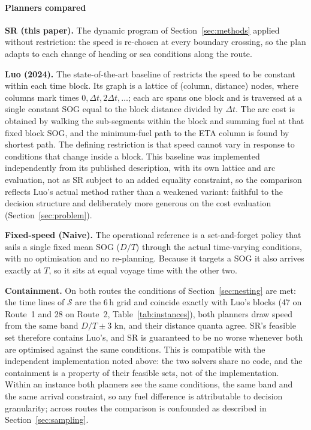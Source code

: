 \documentclass[review,authoryear]{elsarticle}
\begin{document}
\paragraph{Planners compared}
\label{sec:planners}
\textbf{SR (this paper).} The dynamic program of Section~\ref{sec:methods} applied without
restriction: the speed is re-chosen at every boundary crossing, so the plan adapts to each change of
heading or sea conditions along the route.

\noindent\textbf{Luo (2024).} The state-of-the-art baseline of \citet{luo2024} restricts the speed to
be constant within each time block. Its graph is a lattice of (column, distance) nodes, where columns
mark times $0,\Delta t,2\Delta t,\dots$; each arc spans one block and is traversed at a single
constant SOG equal to the block distance divided by $\Delta t$. The arc cost is obtained by walking
the sub-segments within the block and summing fuel at that fixed block SOG, and the minimum-fuel path
to the ETA column is found by shortest path. The defining restriction is that speed cannot vary in
response to conditions that change inside a block. This baseline was implemented independently from
its published description, with its own lattice and arc evaluation, not as SR subject to an added
equality constraint, so the comparison reflects Luo's actual method rather than a weakened variant:
faithful to the decision structure and deliberately more generous on the cost evaluation
(Section~\ref{sec:problem}).

\noindent\textbf{Fixed-speed (Naive).} The operational reference is a set-and-forget policy that sails
a single fixed mean SOG ($D/T$) through the actual time-varying conditions, with no optimisation and
no re-planning. Because it targets a SOG it also arrives exactly at $T$, so it sits at equal voyage
time with the other two.

\noindent\textbf{Containment.} On both routes the conditions of Section~\ref{sec:nesting} are met: the time
lines of $\mathcal{S}$ are the 6\,h grid and coincide exactly with Luo's blocks (47 on Route~1 and 28
on Route~2, Table~\ref{tab:instances}), both planners draw speed from the same band $D/T \pm 3$ kn,
and their distance quanta agree. SR's feasible set therefore contains Luo's, and SR is guaranteed to
be no worse whenever both are optimised against the same conditions. This is compatible with the
independent implementation noted above: the two solvers share no code, and the containment is a
property of their feasible sets, not of the implementation. Within an instance both planners see the
same conditions, the same band and the same arrival constraint, so any fuel difference is
attributable to decision granularity; across routes the comparison is confounded as described in
Section~\ref{sec:sampling}.
\end{document}
